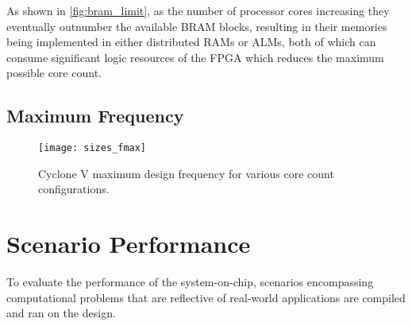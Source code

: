 As shown in \cref{fig:bram_limit}, as the number of processor cores increasing they eventually outnumber the available BRAM blocks, resulting in their memories being implemented in either distributed RAMs or ALMs, both of which can consume significant logic resources of the FPGA which reduces the maximum possible core count.

\subsection{Maximum Frequency}
\begin{figure}
\centering
\texttt{[image: sizes\_fmax]}
\caption{Cyclone V maximum design frequency for various core count configurations.}
\label{fig:sizes_fmax}
\end{figure}

\section{Scenario Performance}
To evaluate the performance of the system-on-chip, scenarios encompassing computational problems that are reflective of real-world applications are compiled and ran on the design.

